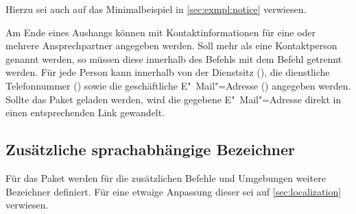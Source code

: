 \begin{Declaration*}{}
\begin{Example}
\begin{Code}[escapechar=§]
{  Bild (optional), einzubinden mit:
    \texttt{[image: §\\PName\{Datei]}§}
}{%
  \item Schwerpunkt 1
  \item Schwerpunkt 2
}
\end{Code}
Hierzu sei auch auf das Minimalbeispiel in \autoref{sec:exmpl:notice} verwiesen.
\end{Example}

\begin{Declaration}{}
\begin{Declaration}{}
\begin{Declaration}{}
\begin{Declaration}{}
\printdeclarationlist%
%
Am Ende eines Aushangs können mit  Kontaktinformationen 
für eine oder mehrere Ansprechpartner angegeben werden. Soll mehr als eine 
Kontaktperson genannt werden, so müssen diese innerhalb des Befehls
 mit dem Befehl  getrennt werden. Für jede 
Person kann innerhalb von  der Dienstsitz 
(), die dienstliche Telefonnummer () sowie die 
geschäftliche E"~Mail"=Adresse () angegeben werden. Sollte 
das Paket  geladen werden, wird die gegebene E"~Mail"=Adresse 
direkt in einen entsprechenden Link gewandelt.
\end{Declaration}
\end{Declaration}
\end{Declaration}
\end{Declaration}


\subsection{Zusätzliche sprachabhängige Bezeichner}
Für das Paket  werden für die zusätzlichen Befehle 
und Umgebungen weitere Bezeichner definiert. Für eine etwaige Anpassung dieser 
sei auf \autoref{sec:localization} verwiesen.


\end{Declaration*}
